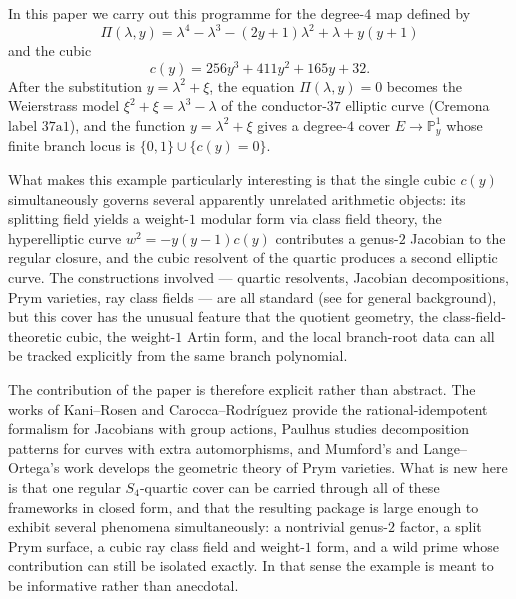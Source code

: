 \documentclass[11pt,letterpaper]{article}
\theoremstyle{plain}
\theoremstyle{remark}
\newcommand{\PP}{\mathbb{P}}
\begin{document}
In this paper we carry out this programme for the degree-\(4\) map defined by
\begin{equation}\label{eq:quartic}
\Pi(\lambda,y)=\lambda^4-\lambda^3-(2y+1)\lambda^2+\lambda+y(y+1)
\end{equation}
and the cubic
\begin{equation}\label{eq:branch-cubic}
c(y)=256y^3+411y^2+165y+32.
\end{equation}
After the substitution \(y=\lambda^2+\xi\), the equation \(\Pi(\lambda,y)=0\) becomes the Weierstrass model \(\xi^2+\xi=\lambda^3-\lambda\) of the conductor-\(37\) elliptic curve (Cremona label \(37\mathrm{a}1\)), and the function \(y=\lambda^2+\xi\) gives a degree-\(4\) cover \(E\to\PP^1_y\) whose finite branch locus is \(\{0,1\}\cup\{c(y)=0\}\).

What makes this example particularly interesting is that the single cubic \(c(y)\) simultaneously governs several apparently unrelated arithmetic objects: its splitting field yields a weight-\(1\) modular form via class field theory, the hyperelliptic curve \(w^2=-y(y-1)c(y)\) contributes a genus-\(2\) Jacobian to the regular closure, and the cubic resolvent of the quartic produces a second elliptic curve. The constructions involved --- quartic resolvents, Jacobian decompositions, Prym varieties, ray class fields --- are all standard (see \cite{Cox2012,KaniRosen1989,Mumford1974,BirkenhakeLange2004,Neukirch1999,CaroccaRodriguez2006,Paulhus2008} for general background), but this cover has the unusual feature that the quotient geometry, the class-field-theoretic cubic, the weight-\(1\) Artin form, and the local branch-root data can all be tracked explicitly from the same branch polynomial.

The contribution of the paper is therefore explicit rather than abstract. The works of Kani--Rosen \cite{KaniRosen1989} and Carocca--Rodr{\'i}guez \cite{CaroccaRodriguez2006} provide the rational-idempotent formalism for Jacobians with group actions, Paulhus \cite{Paulhus2008} studies decomposition patterns for curves with extra automorphisms, and Mumford's and Lange--Ortega's work \cite{Mumford1974,LangeOrtega2011} develops the geometric theory of Prym varieties. What is new here is that one regular \(S_4\)-quartic cover can be carried through all of these frameworks in closed form, and that the resulting package is large enough to exhibit several phenomena simultaneously: a nontrivial genus-\(2\) factor, a split Prym surface, a cubic ray class field and weight-\(1\) form, and a wild prime whose contribution can still be isolated exactly. In that sense the example is meant to be informative rather than anecdotal.
\end{document}
